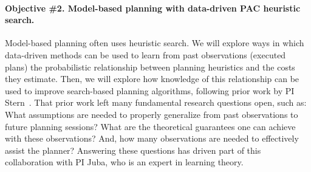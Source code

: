 \documentclass[12pt]{article}
\newcommand{\note}[1]{\textbf{\textit{#1}}}
\begin{document}

\vspace{-0.35cm}
\paragraph{Objective \#2. Model-based planning with data-driven PAC heuristic search.}
Model-based planning often uses heuristic search. We will explore ways in which data-driven methods can be used to learn from past observations (executed plans) the probabilistic relationship between planning heuristics and the costs they estimate. Then, we will explore how knowledge of this relationship can be used to improve search-based planning algorithms, following prior work by PI Stern~\cite{stern2011probably,stern2012exploring,stern2014potential}.
That prior work left many fundamental research questions open, such as: What assumptions are needed to properly generalize from past observations to future planning sessions? What are the theoretical guarantees one can achieve with these observations? And, how many observations are needed to effectively assist the planner? Answering these questions has driven part of this collaboration with PI Juba, who is an expert in learning theory. 




\end{document}
